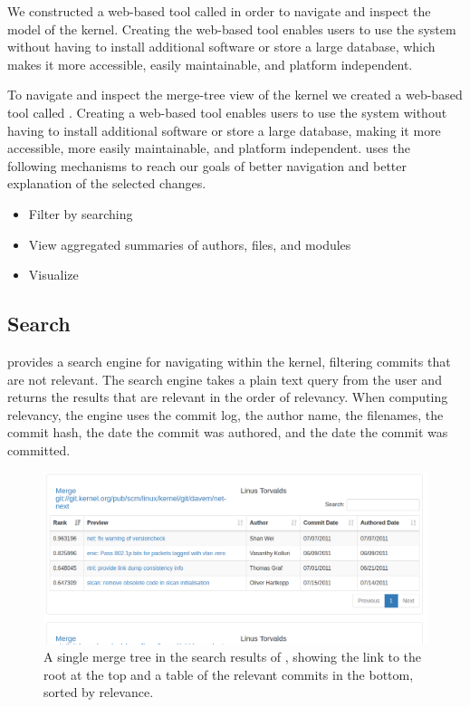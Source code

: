 
We constructed a web-based tool called \tool in order to navigate and
inspect the \mt model of the kernel. Creating the web-based tool enables
users to use the system without having to install additional software or
store a large database, which makes it more accessible, easily
maintainable, and platform independent.

To navigate and inspect the merge-tree view of the kernel we created a
web-based tool called \tool. Creating a web-based tool enables users to
use the system without having to install additional software or store a
large database, making it more accessible, more easily maintainable, and
platform independent. \tool uses the following mechanisms to reach our
goals of better navigation and better explanation of the selected
changes.

\begin{itemize}
        \item Filter by searching
        \item View aggregated summaries of authors, files, and modules
        \item Visualize 
\end{itemize}

\subsection{Search}

\tool provides a search engine for navigating within the kernel,
filtering commits that are not relevant. The search engine takes a
plain text query from the user and returns the results that are relevant
in the order of relevancy. When computing relevancy, the engine uses the
commit log, the author name, the filenames, the commit hash, the date
the commit was authored, and the date the commit was committed.

\begin{figure}[htpb]
  \centering
  \includegraphics[width=\linewidth]{figures/linvis/search_results.png}
  \caption{A single merge tree in the search results of \tool, showing
    the link to the root at the top and a table of the relevant commits
    in the bottom, sorted by relevance.}
  \label{fig:search_results}
\end{figure}


